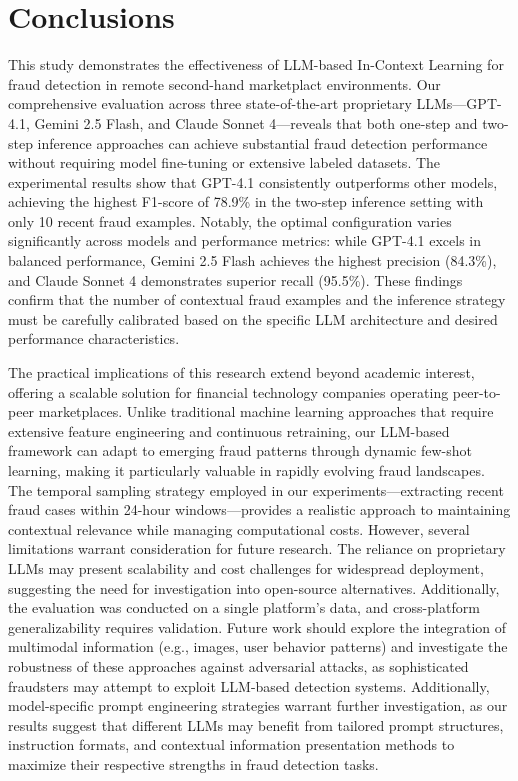 \documentclass[sigconf]{acmart}
\begin{document}
\section{Conclusions}\label{conclusions}
This study demonstrates the effectiveness of LLM-based In-Context Learning for fraud detection in remote second-hand marketplact environments. Our comprehensive evaluation across three state-of-the-art proprietary LLMs—GPT-4.1, Gemini 2.5 Flash, and Claude Sonnet 4—reveals that both one-step and two-step inference approaches can achieve substantial fraud detection performance without requiring model fine-tuning or extensive labeled datasets. The experimental results show that GPT-4.1 consistently outperforms other models, achieving the highest F1-score of 78.9\% in the two-step inference setting with only 10 recent fraud examples. Notably, the optimal configuration varies significantly across models and performance metrics: while GPT-4.1 excels in balanced performance, Gemini 2.5 Flash achieves the highest precision (84.3\%), and Claude Sonnet 4 demonstrates superior recall (95.5\%). These findings confirm that the number of contextual fraud examples and the inference strategy must be carefully calibrated based on the specific LLM architecture and desired performance characteristics.

The practical implications of this research extend beyond academic interest, offering a scalable solution for financial technology companies operating peer-to-peer marketplaces. Unlike traditional machine learning approaches that require extensive feature engineering and continuous retraining, our LLM-based framework can adapt to emerging fraud patterns through dynamic few-shot learning, making it particularly valuable in rapidly evolving fraud landscapes. The temporal sampling strategy employed in our experiments—extracting recent fraud cases within 24-hour windows—provides a realistic approach to maintaining contextual relevance while managing computational costs. However, several limitations warrant consideration for future research. The reliance on proprietary LLMs may present scalability and cost challenges for widespread deployment, suggesting the need for investigation into open-source alternatives. Additionally, the evaluation was conducted on a single platform's data, and cross-platform generalizability requires validation. Future work should explore the integration of multimodal information (e.g., images, user behavior patterns) and investigate the robustness of these approaches against adversarial attacks, as sophisticated fraudsters may attempt to exploit LLM-based detection systems. Additionally, model-specific prompt engineering strategies warrant further investigation, as our results suggest that different LLMs may benefit from tailored prompt structures, instruction formats, and contextual information presentation methods to maximize their respective strengths in fraud detection tasks.





 
\end{document}
